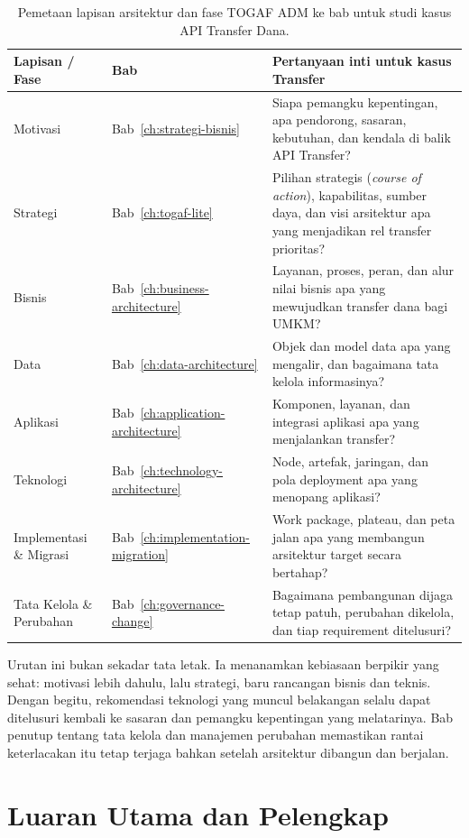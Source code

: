 \begin{table}[htbp]
\centering
\scriptsize
\caption{Pemetaan lapisan arsitektur dan fase TOGAF ADM ke bab untuk studi kasus
API Transfer Dana.}
\label{tab:peta-lapisan}
\begin{tabularx}{\textwidth}{@{}p{} p{} X@{}}
\hline
\textbf{Lapisan / Fase} & \textbf{Bab} & \textbf{Pertanyaan inti untuk kasus Transfer} \\
\hline
Motivasi & Bab~\ref{ch:strategi-bisnis} & Siapa pemangku kepentingan, apa
pendorong, sasaran, kebutuhan, dan kendala di balik API Transfer? \\
Strategi & Bab~\ref{ch:togaf-lite} & Pilihan strategis (\emph{course of
action}), kapabilitas, sumber daya, dan visi arsitektur apa yang menjadikan rel
transfer prioritas? \\
Bisnis & Bab~\ref{ch:business-architecture} & Layanan, proses, peran, dan alur
nilai bisnis apa yang mewujudkan transfer dana bagi UMKM? \\
Data & Bab~\ref{ch:data-architecture} & Objek dan model data apa yang mengalir,
dan bagaimana tata kelola informasinya? \\
Aplikasi & Bab~\ref{ch:application-architecture} & Komponen, layanan, dan
integrasi aplikasi apa yang menjalankan transfer? \\
Teknologi & Bab~\ref{ch:technology-architecture} & Node, artefak, jaringan, dan
pola deployment apa yang menopang aplikasi? \\
Implementasi \& Migrasi & Bab~\ref{ch:implementation-migration} & Work package,
plateau, dan peta jalan apa yang membangun arsitektur target secara bertahap? \\
Tata Kelola \& Perubahan & Bab~\ref{ch:governance-change} & Bagaimana pembangunan
dijaga tetap patuh, perubahan dikelola, dan tiap requirement ditelusuri? \\
\hline
\end{tabularx}
\end{table}

Urutan ini bukan sekadar tata letak. Ia menanamkan kebiasaan berpikir yang
sehat: motivasi lebih dahulu, lalu strategi, baru rancangan bisnis dan teknis.
Dengan begitu, rekomendasi teknologi yang muncul belakangan selalu dapat
ditelusuri kembali ke sasaran dan pemangku kepentingan yang melatarinya. Bab
penutup tentang tata kelola dan manajemen perubahan memastikan rantai
keterlacakan itu tetap terjaga bahkan setelah arsitektur dibangun dan berjalan.

\section{Luaran Utama dan Pelengkap}

